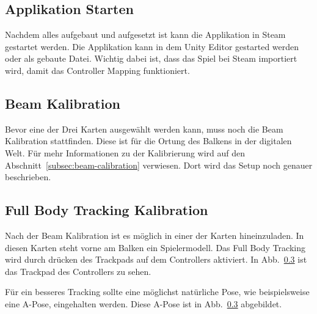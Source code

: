 \subsection{Applikation Starten}\label{subsec:run-application}

Nachdem alles aufgebaut und aufgesetzt ist kann die Applikation in Steam gestartet werden.
Die Applikation kann in dem Unity Editor gestarted werden oder als gebaute Datei.
Wichtig dabei ist, dass das Spiel bei Steam importiert wird, damit das Controller Mapping funktioniert.

\subsection{Beam Kalibration}

Bevor eine der Drei Karten ausgewählt werden kann, muss noch die Beam Kalibration stattfinden.
Diese ist für die Ortung des Balkens in der digitalen Welt.
Für mehr Informationen zu der Kalibrierung wird auf den Abschnitt~\ref{subsec:beam-calibration} verwiesen.
Dort wird das Setup noch genauer beschrieben.

\subsection{Full Body Tracking Kalibration}

Nach der Beam Kalibration ist es möglich in einer der Karten hineinzuladen.
In diesen Karten steht vorne am Balken ein Spielermodell.
Das Full Body Tracking wird durch drücken des Trackpads auf dem Controllers aktiviert.
In Abb.~\ref{} ist das Trackpad des Controllers zu sehen.

Für ein besseres Tracking sollte eine möglichst natürliche Pose, wie beispielsweise eine A-Pose, eingehalten werden.
Diese A-Pose ist in Abb.~\ref{} abgebildet.

